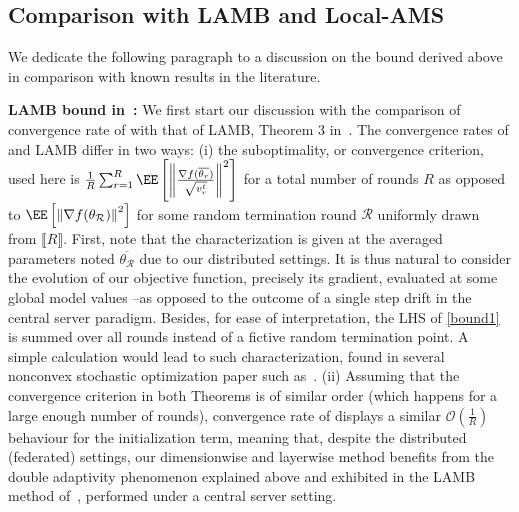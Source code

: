 \documentclass[11pt]{article}
\begin{document}
\subsection{Comparison with LAMB and Local-AMS}

We dedicate the following paragraph to a discussion on the bound derived above in comparison with known results in the literature.

\vspace{0.05in}
\textbf{LAMB bound in~\citet{you2019large}: }
We first start our discussion with the comparison of convergence rate of \algo with that of LAMB, Theorem 3 in~\citep{you2019large}. 
The convergence rates of \algo and LAMB differ in two ways: (i) the suboptimality, or convergence criterion, used here is $\frac{1}{R}\sum_{r=1}^R  \EE\left[ \left\| \frac{\nabla f(\overline{\theta_r})}{\sqrt{ v_r^t}}   \right \|^2 \right]$ for a total number of rounds $R$ as opposed to $ \EE\left[ \left\| \nabla f(\theta_\mathcal{R}) \right \|^2 \right] $ for some random termination round $\mathcal{R}$ uniformly drawn from $\llbracket R \rrbracket$.
First, note that the characterization is given at the averaged parameters noted $\overline{\theta_\mathcal{R}}$ due to our distributed settings. 
It is thus natural to consider the evolution of our objective function, precisely its gradient, evaluated at some global model values --as opposed to the outcome of a single step drift in the central server paradigm. 
Besides, for ease of interpretation, the LHS of \eqref{bound1} is summed over all rounds instead of a fictive random termination point. A simple calculation would lead to such characterization, found in several nonconvex stochastic optimization paper such as~\citep{ghadimi2013stochastic}.
(ii)  Assuming that the convergence criterion in both Theorems is of similar order (which happens for a large enough number of rounds), convergence rate of \algo displays a similar $\mathcal{O}(\frac{1}{R})$ behaviour for the initialization term, meaning that, despite the distributed (federated) settings, our dimensionwise and layerwise method benefits from the double adaptivity phenomenon explained above and exhibited in the LAMB method of~\citep{you2019large}, performed under a central server setting.
\end{document}
